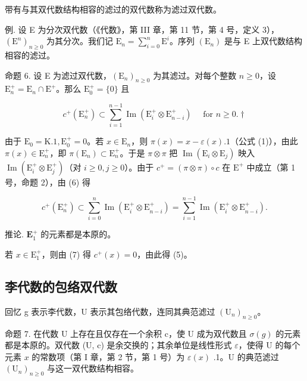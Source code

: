 带有与其双代数结构相容的滤过的双代数称为滤过双代数。

例. 设 E 为分次双代数（《代数》，第 III 章，第 11 节，第 4 号，定义 3），\((\mathrm{E}^n)_{n\geqslant 0}\) 为其分次。我们记 \(\mathrm{E}_n = \sum_{i = 0}^{n}\mathrm{E}^i\)。序列 \((\mathrm{E}_n)\) 是与 E 上双代数结构相容的滤过。

命题 6. 设 E 为滤过双代数，\((\mathrm{E}_n)_{n\geqslant 0}\) 为其滤过。对每个整数 \(n\geqslant 0\)，设 \(\mathrm{E}_n^+ = \mathrm{E}_n\cap \mathrm{E}^+\)。那么 \(\mathrm{E_0^+} = \{0\}\) 且

\[
c ^ {+} (\mathrm{E} _ {n} ^ {+}) \subset \sum_ {i = 1} ^ {n - 1} \operatorname{Im} (\mathrm{E} _ {i} ^ {+} \otimes \mathrm{E} _ {n - i} ^ {+}) \quad \text { for } n \geqslant 0. \dagger\tag{7}
\]

由于 \(\mathrm{E}_0 = \mathrm{K}.1, \mathrm{E}_0^+ = 0\)。若 \(x \in \mathrm{E}_n\)，则 \(\pi(x) = x - \varepsilon(x).1\)（公式 (1)），由此 \(\pi(x) \in \mathrm{E}_n^+\)，即 \(\pi(\mathrm{E}_n) \subset \mathrm{E}_n^+\)。于是 \(\pi \otimes \pi\) 把 \(\operatorname{Im}(\mathrm{E}_i \otimes \mathrm{E}_j)\) 映入 \(\operatorname{Im}(\mathrm{E}_i^+ \otimes \mathrm{E}_j^+)\)（对 \(i \geqslant 0, j \geqslant 0\)）。由于 \(c^+ = (\pi \otimes \pi) \circ c\) 在 \(\mathrm{E}^+\) 中成立（第 1 号，命题 2），由 (6) 得

\[
c ^ {+} \left(\mathrm{E} _ {n} ^ {+}\right) \subset \sum_ {i = 0} ^ {n} \operatorname{Im} \left(\mathrm{E} _ {i} ^ {+} \otimes \mathrm{E} _ {n - i} ^ {+}\right) = \sum_ {i = 1} ^ {n - 1} \operatorname{Im} \left(\mathrm{E} _ {i} ^ {+} \otimes \mathrm{E} _ {n - i} ^ {+}\right).
\]

推论. \(\mathbf{E}_1^+\) 的元素都是本原的。

若 \(x \in \mathrm{E}_{1}^{+}\)，则由 (7) 得 \(c^{+}(x) = 0\)，由此得 (5)。

\subsection{李代数的包络双代数}

回忆 g 表示李代数，U 表示其包络代数，连同其典范滤过 \((\mathrm{U}_{n})_{n\geqslant0}\)。

命题 7. 在代数 U 上存在且仅存在一个余积 c，使 U 成为双代数且 \(\sigma(g)\) 的元素都是本原的。双代数 (U, c) 是余交换的；其余单位是线性形式 \(\varepsilon\)，使得 U 的每个元素 \(x\) 的常数项（第 I 章，第 2 节，第 1 号）为 \(\varepsilon(x)\) .1。U 的典范滤过 \((\mathrm{U}_n)_{n\geqslant 0}\) 与这一双代数结构相容。

